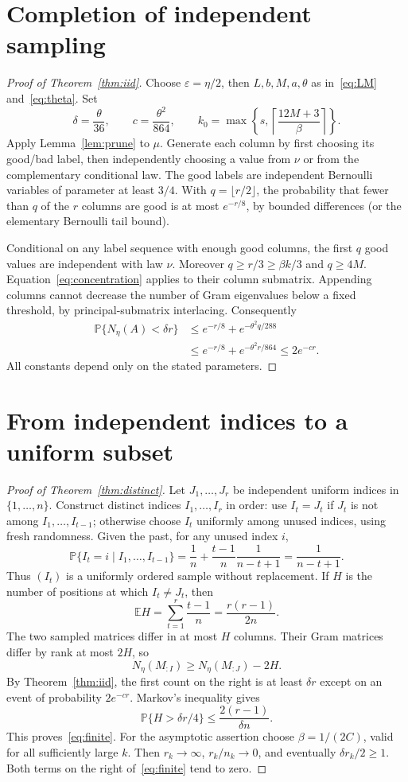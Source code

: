 \documentclass[11pt]{article}
\theoremstyle{remark}\newtheorem{remark}[theorem]{Remark}
\newcommand{\E}{\mathbb E}\newcommand{\PP}{\mathbb P}
\begin{document}
\section{Completion of independent sampling}
\begin{proof}[Proof of Theorem~\ref{thm:iid}]
Choose $\varepsilon=\eta/2$, then $L,b,M,a,\theta$ as in~\eqref{eq:LM} and~\eqref{eq:theta}. Set
\[
 \delta=\frac\theta{36},\qquad c=\frac{\theta^2}{864},\qquad
 k_0=\max\left\{s,\left\lceil\frac{12M+3}{\beta}\right\rceil\right\}.
\]
Apply Lemma~\ref{lem:prune} to $\mu$. Generate each column by first choosing its good/bad label, then independently choosing a value from $\nu$ or from the complementary conditional law. The good labels are independent Bernoulli variables of parameter at least $3/4$. With $q=\lfloor r/2\rfloor$, the probability that fewer than $q$ of the $r$ columns are good is at most $e^{-r/8}$, by bounded differences (or the elementary Bernoulli tail bound).

Conditional on any label sequence with enough good columns, the first $q$ good values are independent with law $\nu$. Moreover $q\ge r/3\ge\beta k/3$ and $q\ge4M$. Equation~\eqref{eq:concentration} applies to their column submatrix. Appending columns cannot decrease the number of Gram eigenvalues below a fixed threshold, by principal-submatrix interlacing. Consequently
\begin{align*}
 \PP\{N_\eta(A)<\delta r\}
 &\le e^{-r/8}+e^{-\theta^2q/288}\\
 &\le e^{-r/8}+e^{-\theta^2r/864}\le2e^{-cr}.
\end{align*}
All constants depend only on the stated parameters.
\end{proof}

\section{From independent indices to a uniform subset}
\begin{proof}[Proof of Theorem~\ref{thm:distinct}]
Let $J_1,\dots,J_r$ be independent uniform indices in $\{1,\dots,n\}$. Construct distinct indices $I_1,\dots,I_r$ in order: use $I_t=J_t$ if $J_t$ is not among $I_1,\dots,I_{t-1}$; otherwise choose $I_t$ uniformly among unused indices, using fresh randomness. Given the past, for any unused index $i$,
\[
 \PP\{I_t=i\mid I_1,\dots,I_{t-1}\}
 =\frac1n+\frac{t-1}{n}\frac1{n-t+1}
 =\frac1{n-t+1}.
\]
Thus $(I_t)$ is a uniformly ordered sample without replacement. If $H$ is the number of positions at which $I_t\ne J_t$, then
\[
 \E H=\sum_{t=1}^r\frac{t-1}{n}=\frac{r(r-1)}{2n}.
\]
The two sampled matrices differ in at most $H$ columns. Their Gram matrices differ by rank at most $2H$, so
\[
 N_\eta(M_{:I})\ge N_\eta(M_{:J})-2H.
\]
By Theorem~\ref{thm:iid}, the first count on the right is at least $\delta r$ except on an event of probability $2e^{-cr}$. Markov's inequality gives
\[
 \PP\{H>\delta r/4\}\le\frac{2(r-1)}{\delta n}.
\]
This proves~\eqref{eq:finite}. For the asymptotic assertion choose $\beta=1/(2C)$, valid for all sufficiently large $k$. Then $r_k\to\infty$, $r_k/n_k\to0$, and eventually $\delta r_k/2\ge1$. Both terms on the right of~\eqref{eq:finite} tend to zero.
\end{proof}
\end{document}
